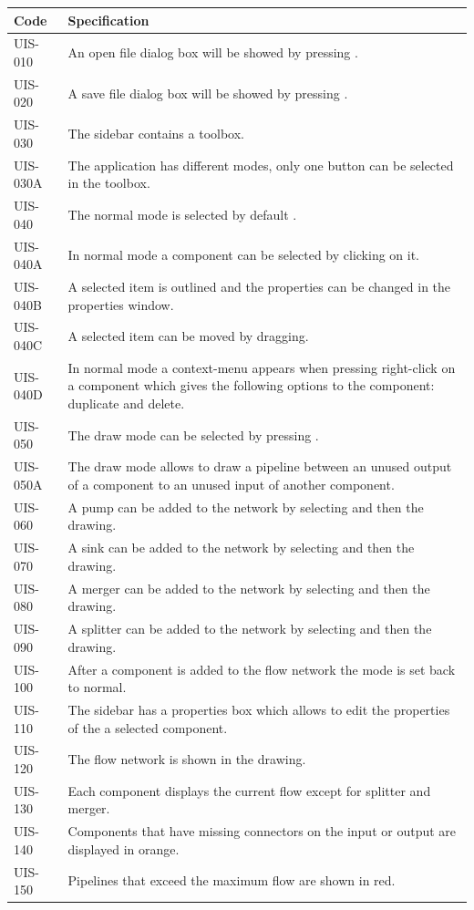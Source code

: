 \begin{tabularx}{\textwidth}{|p{2cm}X|}\hline
	Code & Specification \\\hline
	UIS-010 & An open file dialog box will be showed by pressing \faicon{folder-open}. \\\hline
	UIS-020 & A save file dialog box will be showed by pressing \faicon{floppy-o}. \\\hline
	UIS-030 & The sidebar contains a toolbox. \\\hline
	UIS-030A & The application has different modes, only one button can be selected in the toolbox.  \\\hline
	UIS-040 & The normal mode is selected by default \faicon{mouse-pointer}. \\\hline
	UIS-040A & In normal mode a component can be selected by clicking on it. \\\hline
	UIS-040B & A selected item is outlined and the properties can be changed in the properties window. \\\hline
	UIS-040C & A selected item can be moved by dragging. \\\hline
	UIS-040D & In normal mode a context-menu appears when pressing right-click on a component which gives the following options to the component: duplicate and delete. \\\hline
	UIS-050 & The draw mode can be selected by pressing \faicon{pencil}. \\\hline
	UIS-050A & The draw mode allows to draw a pipeline between an unused output of a component to an unused input of another component. \\\hline
	UIS-060 & A pump can be added to the network by selecting \faicon{sign-out} and then the drawing. \\\hline
	UIS-070 & A sink can be added to the network by selecting \faicon{sign-in} and then the drawing. \\\hline
	UIS-080 & A merger can be added to the network by selecting \faicon{chevron-right} and then the drawing. \\\hline
	UIS-090 & A splitter can be added to the network by selecting \faicon{chevron-left} and then the drawing. \\\hline
	UIS-100 & After a component is added to the flow network the mode is set back to normal. \\\hline
	UIS-110 & The sidebar has a properties box which allows to edit the properties of the a selected component. \\\hline
	UIS-120 & The flow network is shown in the drawing. \\\hline
	UIS-130 & Each component displays the current flow except for splitter and merger. \\\hline
	UIS-140 & Components that have missing connectors on the input or output are displayed in orange. \\\hline
	UIS-150 & Pipelines that exceed the maximum flow are shown in red.\\\hline
\end{tabularx}